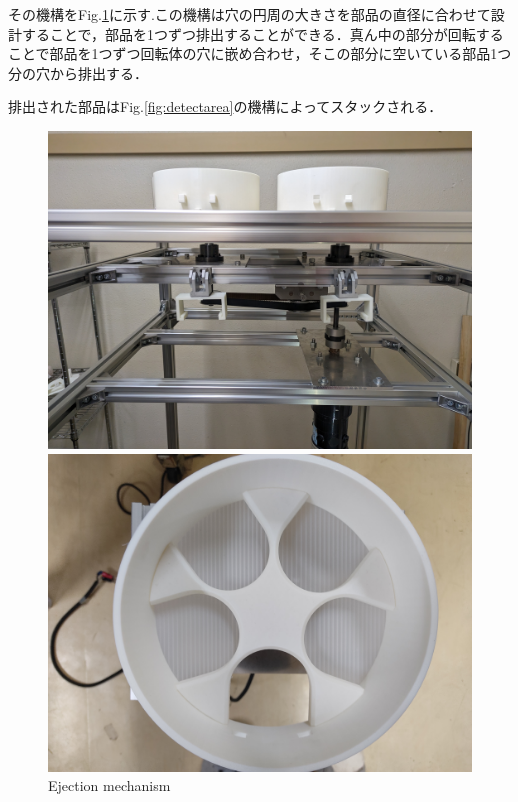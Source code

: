 \documentclass{classes/resume}
\begin{document}
    その機構をFig.\ref{fig:rotationpart}に示す.この機構は穴の円周の大きさを部品の直径に合わせて設計することで，部品を1つずつ排出することができる．真ん中の部分が回転することで部品を1つずつ回転体の穴に嵌め合わせ，そこの部分に空いている部品1つ分の穴から排出する．

    排出された部品はFig.\ref{fig:detectarea}の機構によってスタックされる．

    \begin{figure}[b]
        \centering
        \begin{minipage}[t]{0.45\linewidth}
            \centering
            \includegraphics[width=0.9\linewidth]{figures/entire.jpg}
        \end{minipage}
        \begin{minipage}[t]{0.45\linewidth}
            \centering
            \includegraphics[width=0.9\linewidth]{figures/rotary.jpg}
        \end{minipage}
        \caption{Ejection mechanism}
        \label{fig:rotationpart}
    \end{figure}
\end{document}
